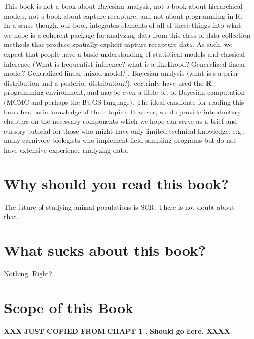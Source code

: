 This book is not a book about Bayesian analysis, not a book about
hierarchical models, not a book about capture-recapture, and not about
programming in R. In a sense though, our book integrates elements of
all of these things into what we hope is a coherent package for
analyzing data from this class of data collection methods
that produce spatially-explicit capture-recapture data.   As such, we
expect that people have a basic understanding of statistical models
and classical inference (What is frequentist inference? what is a
likelihood? Generalized linear model? Generalized linear mixed
model?), 
 Bayesian analysis (what is s a prior distribution and a
posterior distribution?),
certainly have used the {\bf R} programming environment,
and maybe even a little bit
of Bayesian
computation (MCMC and perhaps the BUGS language).
The ideal candidate for reading this book has basic knowledge of these
topics. However, we do provide introductory chapters on the necessary
components which we hope can serve as a brief and cursory tutorial for
those who might have only limited technical knowledge, e.g., many
carnivore biologists who implement field sampling programs but do not
have extensive experience analyzing data.

\section*{Why should you read this book?}

The future of studying animal populations is SCR. There is not doubt
about that. 

\section{What sucks about this book?}

Nothing. Right?




\section{Scope of this Book}

{\bf XXX JUST COPIED FROM CHAPT 1 . Should go here. XXXX}


